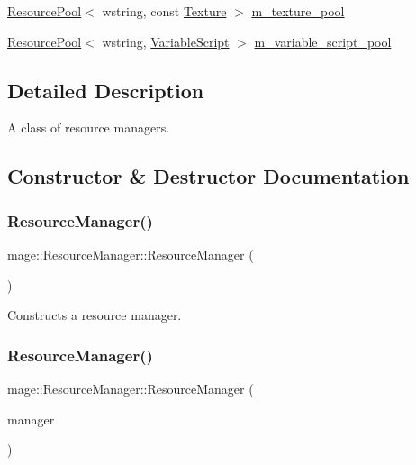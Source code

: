 \begin{DoxyCompactItemize}
\item 
\hyperlink{classmage_1_1_resource_pool}{Resource\+Pool}$<$ wstring, const \hyperlink{classmage_1_1_texture}{Texture} $>$ \hyperlink{classmage_1_1_resource_manager_afd1a86759068e33e06df595ac0fd212c}{m\+\_\+texture\+\_\+pool}
\item 
\hyperlink{classmage_1_1_resource_pool}{Resource\+Pool}$<$ wstring, \hyperlink{classmage_1_1_variable_script}{Variable\+Script} $>$ \hyperlink{classmage_1_1_resource_manager_a0da21bf8c511af4238cd1be0f7f7d31d}{m\+\_\+variable\+\_\+script\+\_\+pool}
\end{DoxyCompactItemize}


\subsection{Detailed Description}
A class of resource managers. 

\subsection{Constructor \& Destructor Documentation}
\hypertarget{classmage_1_1_resource_manager_a0ff509899a9fbef2096c60b3d3d80bd5}{}\label{classmage_1_1_resource_manager_a0ff509899a9fbef2096c60b3d3d80bd5} 
\subsubsection{\texorpdfstring{Resource\+Manager()}{ResourceManager()}\hspace{0.1cm}{\footnotesize\ttfamily [1/3]}}
{\footnotesize\ttfamily mage\+::\+Resource\+Manager\+::\+Resource\+Manager (\begin{DoxyParamCaption}{ }\end{DoxyParamCaption})\hspace{0.3cm}{\ttfamily [default]}}

Constructs a resource manager. \hypertarget{classmage_1_1_resource_manager_ac93f3ab65a9f45539b5a0221ebc197fe}{}\label{classmage_1_1_resource_manager_ac93f3ab65a9f45539b5a0221ebc197fe} 
\subsubsection{\texorpdfstring{Resource\+Manager()}{ResourceManager()}\hspace{0.1cm}{\footnotesize\ttfamily [2/3]}}
{\footnotesize\ttfamily mage\+::\+Resource\+Manager\+::\+Resource\+Manager (\begin{DoxyParamCaption}\item[{const \hyperlink{classmage_1_1_resource_manager}{Resource\+Manager} \&}]{manager }\end{DoxyParamCaption})\hspace{0.3cm}{\ttfamily [delete]}}

